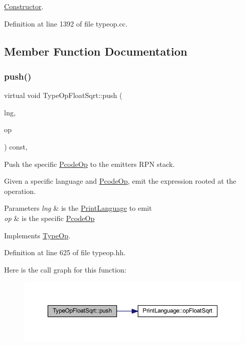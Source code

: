 \mbox{\hyperlink{class_constructor}{Constructor}}. 



Definition at line 1392 of file typeop.\+cc.



\subsection{Member Function Documentation}
\mbox{\label{class_type_op_float_sqrt_a18e76ebe588fb1b41b0917f52451e258}} 
\subsubsection{\texorpdfstring{push()}{push()}}
{\footnotesize\ttfamily virtual void Type\+Op\+Float\+Sqrt\+::push (\begin{DoxyParamCaption}\item[{\mbox{\hyperlink{class_print_language}{Print\+Language}} $\ast$}]{lng,  }\item[{const \mbox{\hyperlink{class_pcode_op}{Pcode\+Op}} $\ast$}]{op }\end{DoxyParamCaption}) const\hspace{0.3cm}{\ttfamily [inline]}, {\ttfamily [virtual]}}



Push the specific \mbox{\hyperlink{class_pcode_op}{Pcode\+Op}} to the emitter\textquotesingle{}s R\+PN stack. 

Given a specific language and \mbox{\hyperlink{class_pcode_op}{Pcode\+Op}}, emit the expression rooted at the operation. 
\begin{DoxyParams}{Parameters}
{\em lng} & is the \mbox{\hyperlink{class_print_language}{Print\+Language}} to emit \\
\hline
{\em op} & is the specific \mbox{\hyperlink{class_pcode_op}{Pcode\+Op}} \\
\hline
\end{DoxyParams}


Implements \mbox{\hyperlink{class_type_op_ac9c9544203ed74dabe6ac662b653b2af}{Type\+Op}}.



Definition at line 625 of file typeop.\+hh.

Here is the call graph for this function\+:
\nopagebreak
\begin{figure}[H]
\begin{center}
\leavevmode
\includegraphics[width=350pt]{class_type_op_float_sqrt_a18e76ebe588fb1b41b0917f52451e258_cgraph}
\end{center}
\end{figure}


